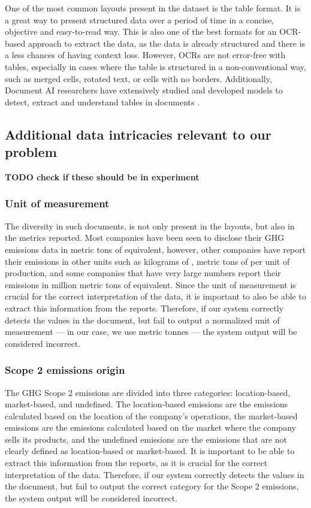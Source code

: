 \documentclass[english, 12pt, a4paper, elec, utf8, a-2b, online]{aaltothesis}
\begin{document}
One of the most common layouts present in the dataset is the table format.
It is a great way to present structured data over a period of time in a concise, objective and easy-to-read way.
This is also one of the best formats for an \ac{OCR}-based approach to extract the data, as the data is already structured and there is a less chances of having context loss.
However, OCRs are not error-free with tables, especially in cases where the table is structured in a non-conventional way, such as merged cells, rotated text, or cells with no borders.
Additionally, Document AI researchers have extensively studied and developed models to detect, extract and understand tables in documents \cite{TableNet2020, table_extraction_conditional_pinto_2003, Schreiber2017, Li2022, Gilani2017, Shafait2010}.

\subsection{Additional data intricacies relevant to our problem}

\textbf{TODO check if these should be in experiment}
\subsubsection{Unit of measurement}

The diversity in such documents, is not only present in the layouts, but also in the metrics reported.
Most companies have been seen to disclose their \ac{GHG} emissions data in metric tons of  equivalent, however, other companies have report their emissions in other units such as kilograms of , metric tons of  per unit of production, and some companies that have very large numbers report their emissions in million metric tons of  equivalent.
Since the unit of measurement is crucial for the correct interpretation of the data, it is important to also be able to extract this information from the reports.
Therefore, if our system correctly detects the values in the document, but fail to output a normalized unit of measurement --- in our case, we use metric tonnes --- the system output will be considered incorrect.

\subsubsection{Scope 2 emissions origin}

The \ac{GHG} Scope 2 emissions are divided into three categories: location-based, market-based, and undefined.
The location-based emissions are the emissions calculated based on the location of the company's operations, the market-based emissions are the emissions calculated based on the market where the company sells its products, and the undefined emissions are the emissions that are not clearly defined as location-based or market-based.
It is important to be able to extract this information from the reports, as it is crucial for the correct interpretation of the data.
Therefore, if our system correctly detects the values in the document, but fail to output the correct category for the Scope 2 emissions, the system output will be considered incorrect.
\end{document}

